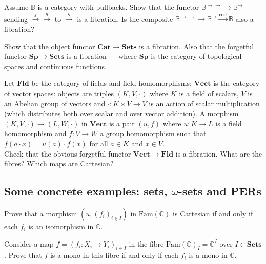 \documentclass{report}
\newcommand{\bB}[0]{\mathbb B}
\newcommand{\bC}[0]{\mathbb C}
\newcommand{\cod}[0]{\mathrm{cod}}
\newcommand{\Cat}[0]{\mathbf{Cat}}
\newcommand{\Sets}[0]{\mathbf{Sets}}
\newcommand{\Fam}[0]{\mathrm{Fam}}
\begin{document}
\begin{exo}
    Assume $\bB$ is a category with pullbacks. Show that the functor $\bB^{\to\to}\to\bB^\to$ sending
    $\overset{f}{\to}\overset{g}{\to}$ to $\overset{g}{\to}$ is a fibration. Is the composite
    $\bB^{\to\to}\to\bB^\to\overset{\cod}{\to}\bB$ also a fibration?
\end{exo}

\begin{exo}
    Show that the object functor $\Cat\to\Sets$ is a fibration. Also that the forgetful functor
    $\mathbf{Sp}\to\Sets$ is a fibration --- where $\mathbf{Sp}$ is the category of topological spaces
    and continuous functions.
\end{exo}

\begin{exo}
    Let $\mathbf{Fld}$ be the category of fields and field homomorphisms; $\mathbf{Vect}$ is the
    category of vector spaces: objects are triples $(K,V,\cdot)$ where $K$ is a field of scalars, $V$
    is an Abelian group of vectors and $\cdot : K\times V \to V$ is an action of scalar multiplication
    (which distributes both over scalar and over vector addition). A morphism $(K,V,\cdot)\to
    (L,W,\cdot)$ in $\mathbf{Vect}$ is a pair $(u,f)$ where $u : K \to L$ is a field homomorphism and
    $f : V \to W$ a group homomorphism such that $f(a\cdot x) = u(a)\cdot f(x)$ for all $a\in K$ and
    $x \in V$.\\
    Check that the obvious forgetful functor $\mathbf{Vect}\to\mathbf{Fld}$ is a fibration. What are
    the fibres? Which maps are Cartesian?
\end{exo}

\subsection{Some concrete examples: sets, \texorpdfstring{$\omega$}{omega}-sets and PERs}

\begin{exo}
    Prove that a morphism $(u,(f_i)_{i\in I})$ in $\Fam(\bC)$ is Cartesian if and only if each $f_i$ is an
    isomorphism in $\bC$.
\end{exo}

\begin{exo}
    Consider a map $f = (f_i : X_i\to Y_i)_{i\in I}$ in the fibre $\Fam(\bC)_I = \bC^I$ over $I\in\Sets$.
    Prove that $f$ is a mono in this fibre if and only if each $f_i$ is a mono in $\bC$.
\end{exo}
\end{document}
